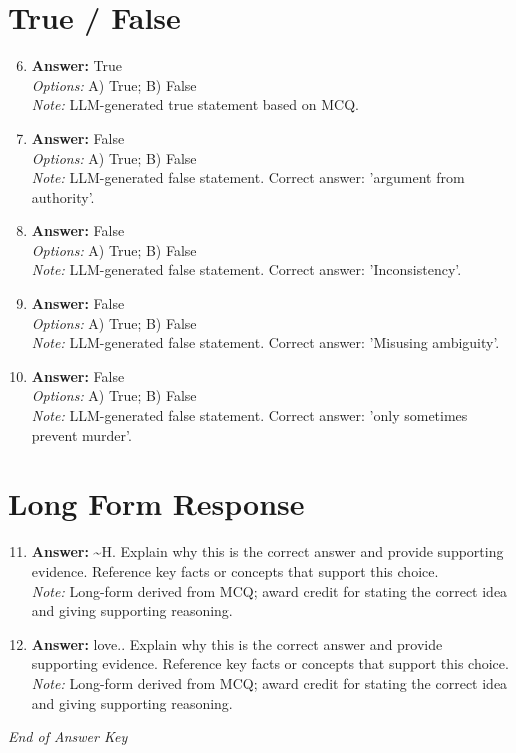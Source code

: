 \documentclass[12pt]{article}
\begin{document}
\section*{True / False}
\begin{enumerate}[label=\arabic*.]
\setcounter{enumi}{5}
\item \textbf{Answer:} True
\\ \textit{Options:} A) True; B) False
\\ \textit{Note:} LLM-generated true statement based on MCQ.
\item \textbf{Answer:} False
\\ \textit{Options:} A) True; B) False
\\ \textit{Note:} LLM-generated false statement. Correct answer: 'argument from authority'.
\item \textbf{Answer:} False
\\ \textit{Options:} A) True; B) False
\\ \textit{Note:} LLM-generated false statement. Correct answer: 'Inconsistency'.
\item \textbf{Answer:} False
\\ \textit{Options:} A) True; B) False
\\ \textit{Note:} LLM-generated false statement. Correct answer: 'Misusing ambiguity'.
\item \textbf{Answer:} False
\\ \textit{Options:} A) True; B) False
\\ \textit{Note:} LLM-generated false statement. Correct answer: 'only sometimes prevent murder'.
\end{enumerate}

\section*{Long Form Response}
\begin{enumerate}[label=\arabic*.]
\setcounter{enumi}{10}
\item \textbf{Answer:} \textasciitilde{}H. Explain why this is the correct answer and provide supporting evidence. Reference key facts or concepts that support this choice.
\\ \textit{Note:} Long-form derived from MCQ; award credit for stating the correct idea and giving supporting reasoning.
\item \textbf{Answer:} love.. Explain why this is the correct answer and provide supporting evidence. Reference key facts or concepts that support this choice.
\\ \textit{Note:} Long-form derived from MCQ; award credit for stating the correct idea and giving supporting reasoning.
\end{enumerate}

\vfill
\noindent\textit{End of Answer Key}
\end{document}

